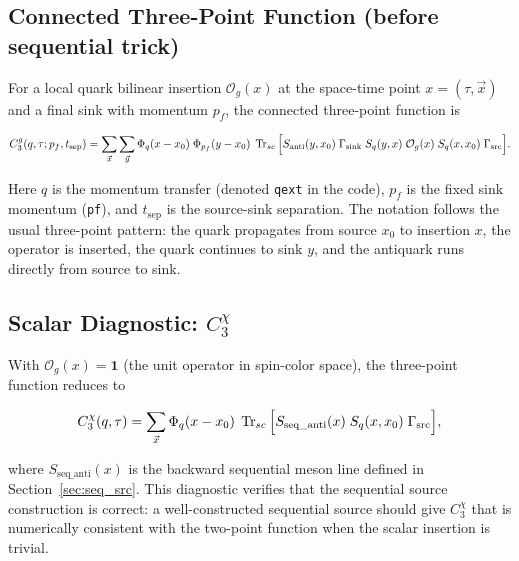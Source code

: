 \documentclass[11pt,a4paper]{article}
\newcommand{\code}[1]{\texttt{#1}}
\begin{document}
\subsection{Connected Three-Point Function (before sequential trick)}
\label{sec:3pt_pre_seq}

For a local quark bilinear insertion $\mathcal{O}_g(x)$ at the space-time point $x = (\tau, \vec{x})$ and a final sink with momentum $p_f$, the connected three-point function is

\begin{equation}\label{eq:C3_pre_seq}
  C_3^g(q, \tau; p_f, t_{\text{sep}})
    = \sum_{\vec{x}} \sum_{\vec{y}}
      \Phi_q(x - x_0)\; \Phi_{p_f}(y - x_0)\;
      \Tr_{sc}\Big[
        S_{\text{anti}}(y, x_0)\; \Gamma_{\text{sink}}\;
        S_q(y, x)\; \mathcal{O}_g(x)\; S_q(x, x_0)\; \Gamma_{\text{src}}
      \Big].
\end{equation}

Here $q$ is the momentum transfer (denoted \code{qext} in the code), $p_f$ is the fixed sink momentum (\code{pf}), and $t_{\text{sep}}$ is the source-sink separation. The notation follows the usual three-point pattern: the quark propagates from source $x_0$ to insertion $x$, the operator is inserted, the quark continues to sink $y$, and the antiquark runs directly from source to sink.

\subsection{Scalar Diagnostic: $C_3^\chi$}
\label{sec:C3_chi}

With $\mathcal{O}_g(x) = \mathbf{1}$ (the unit operator in spin-color space), the three-point function reduces to

\begin{equation}\label{eq:C3_chi_def}
  C_3^\chi(q, \tau)
    = \sum_{\vec{x}} \Phi_q(x - x_0)\;
      \Tr_{sc}\Big[
        S_{\text{seq\_anti}}(x)\;
        S_q(x, x_0)\;
        \Gamma_{\text{src}}
      \Big],
\end{equation}

where $S_{\text{seq\_anti}}(x)$ is the backward sequential meson line defined in Section~\ref{sec:seq_src}. This diagnostic verifies that the sequential source construction is correct: a well-constructed sequential source should give $C_3^\chi$ that is numerically consistent with the two-point function when the scalar insertion is trivial.
\end{document}
